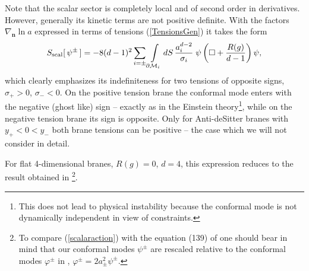 \documentclass[a4paper,12pt]{article}
\newcommand{\ddim}{{d}}
\newcommand{\dM}{{\partial \cal M}}
\newcommand{\un}{\mathbf n} %
\newcommand{\bBox}{\square}  %
\newcommand{\Bnabla}{\nabla}  %
\newcommand{\dS}{dS}
\begin{document}
Note that the scalar sector is completely local and of second
order in derivatives. However, generally its kinetic terms are not
positive definite. With the factors $\Bnabla_{\un}\ln{a}$
expressed in terms of tensions (\ref{TensionsGen}) it takes the
form
    \begin{eqnarray}
    S_{\mathrm{scal}}[\,\psi^\pm\,]=
    -8(\ddim-1)^2\sum_{i=\pm}\int
     \limits_{\dM_i}\dS\,
     \frac{a^{\ddim-2}_i}{\sigma_i}\;
     \psi\left(\bBox
     +\frac{R(g)}{\ddim-1}\right)\psi,    \label{scalaraction}
    \end{eqnarray}
which clearly emphasizes its indefiniteness for two tensions of
opposite signs, $\sigma_+>0$, $\sigma_-<0$. On the positive
tension brane the conformal mode enters with the negative (ghost
like) sign -- exactly as in the Einstein theory\footnote{This does
not lead to physical instability because the conformal mode is not
dynamically independent in view of constraints.}, while on the
negative tension brane its sign is opposite. Only for
Anti-deSitter branes with $y_+<0<y_-$ both brane tensions can be
positive -- the case which we will not consider in detail.

For flat 4-dimensional branes, $R(g)=0$, $d=4$, this expression
reduces to the result obtained in \cite{BWEA}\footnote{To compare
(\ref{scalaraction}) with the equation (139) of \cite{BWEA} one
should bear in mind that our conformal modes $\psi^\pm$ are
rescaled relative to the conformal modes $\varphi^\pm$ in
\cite{BWEA}, $\varphi^\pm=2a_\pm^2\psi^\pm$.}.
\end{document}

